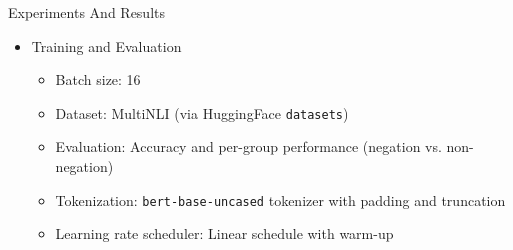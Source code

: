 \documentclass[aspectratio=169,xcolor=dvipsnames]{beamer}
\begin{document}
\begin{frame}{Experiments And Results}
{\begin{itemize}
        \item Training and Evaluation
        \begin{itemize}
            \item Batch size: 16
            \item Dataset: MultiNLI (via HuggingFace \texttt{datasets})
            \item Evaluation: Accuracy and per-group performance (negation vs. non-negation)
            \item Tokenization: \texttt{bert-base-uncased} tokenizer with padding and truncation
            \item Learning rate scheduler: Linear schedule with warm-up
        \end{itemize}

       \end{itemize}
    }

            
            
            


\end{frame}
\end{document}
